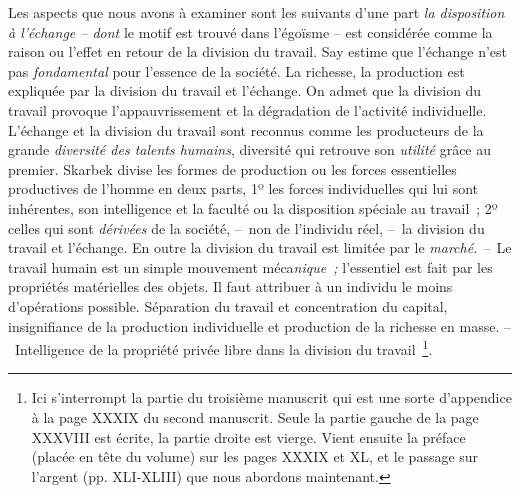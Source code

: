 \documentclass[french,twoside]{book} %
\begin{document}
Les aspects que nous avons à examiner sont les suivants d’une part \emph{la disposition à l’échange – dont} le motif est trouvé dans l’égoïsme – est considérée comme la raison ou l’effet en retour de la division du travail. Say estime que l’échange n’est pas \emph{fondamental} pour l’essence de la société. La richesse, la production est expliquée par la division du travail et l’échange. On admet que la division du travail provoque l’appauvrissement et la dégradation de l’activité individuelle. L’échange et la division du travail sont reconnus comme les producteurs de la grande \emph{diversité des talents humains}, diversité qui retrouve son \emph{utilité} grâce au premier. Skarbek divise les formes de production ou les forces essentielles productives de l’homme en deux parts, 1º les forces individuelles qui lui sont inhérentes, son intelligence et la faculté ou la disposition spéciale au travail ; 2º celles qui sont \emph{dérivées} de la société, – non de l’individu réel, – la division du travail et l’échange. En outre la division du travail est limitée par le \emph{marché. –} Le travail humain est un simple mouvement méca\emph{nique ;} l’essentiel est fait par les propriétés matérielles des objets. Il faut attribuer à un individu le moins d’opérations possible. Séparation du travail et concentration du capital, insignifiance de la production individuelle et production de la richesse en masse. – Intelligence de la propriété privée libre dans la division du travail \footnote{Ici s’interrompt la partie du troisième manuscrit qui est une sorte d’appendice à la page XXXIX du second manuscrit. Seule la partie gauche de la page XXXVIII est écrite, la partie droite est vierge. Vient ensuite la préface (placée en tête du volume) sur les pages XXXIX et XL, et le passage sur l’argent (pp. XLI-XLIII) que nous abordons maintenant.}.
\end{document}
